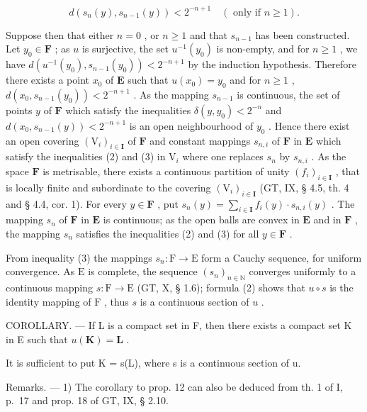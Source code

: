 \[
d \left(s _ {n} (y), s _ {n - 1} (y)\right) <   2 ^ {- n + 1} \quad (\text { only   if } n \geqslant 1).\tag{3}
\]

Suppose then that either \(n = 0\) , or \(n \geqslant 1\) and that \(s_{n-1}\) has been constructed. Let \(y_0 \in \mathbf{F}\) ; as \(u\) is surjective, the set \(u^{-1}(y_0)\) is non-empty, and for \(n \geqslant 1\) , we have \(d(u^{-1}(y_0), s_{n-1}(y_0)) < 2^{-n+1}\) by the induction hypothesis. Therefore there exists a point \(x_0\) of \(\mathbf{E}\) such that \(u(x_0) = y_0\) and for \(n \geqslant 1\) , \(d(x_0, s_{n-1}(y_0)) < 2^{-n+1}\) . As the mapping \(s_{n-1}\) is continuous, the set of points \(y\) of \(\mathbf{F}\) which satisfy the inequalities \(\delta(y, y_0) < 2^{-n}\) and \(d(x_0, s_{n-1}(y)) < 2^{-n+1}\) is an open neighbourhood of \(y_0\) . Hence there exist an open covering \((\mathrm{V}_i)_{i \in \mathbf{I}}\) of \(\mathbf{F}\) and constant mappings \(s_{n,i}\) of \(\mathbf{F}\) in \(\mathbf{E}\) which satisfy the inequalities (2) and (3) in \(\mathrm{V}_i\) where one replaces \(s_n\) by \(s_{n,i}\) . As the space \(\mathbf{F}\) is metrisable, there exists a continuous partition of unity \((f_i)_{i \in \mathbf{I}}\) , that is locally finite and subordinate to the covering \((\mathrm{V}_i)_{i \in \mathbf{I}}\) (GT, IX, § 4.5, th. 4 and § 4.4, cor. 1). For every \(y \in \mathbf{F}\) , put \(s_n(y) = \sum_{i \in \mathbf{I}} f_i(y) \cdot s_{n,i}(y)\) . The mapping \(s_n\) of \(\mathbf{F}\) in \(\mathbf{E}\) is continuous; as the open balls are convex in \(\mathbf{E}\) and in \(\mathbf{F}\) , the mapping \(s_n\) satisfies the inequalities (2) and (3) for all \(y \in \mathbf{F}\) .

From inequality (3) the mappings \(s_n: \mathrm{F} \to \mathrm{E}\) form a Cauchy sequence, for uniform convergence. As \(\mathrm{E}\) is complete, the sequence \((s_n)_{n \in \mathbb{N}}\) converges uniformly to a continuous mapping \(s: \mathrm{F} \to \mathrm{E}\) (GT, X, § 1.6); formula (2) shows that \(u \circ s\) is the identity mapping of \(\mathrm{F}\) , thus \(s\) is a continuous section of \(u\) .

COROLLARY. --- If L is a compact set in F, then there exists a compact set K in E such that \(u(\mathbf{K}) = \mathbf{L}\) .

It is sufficient to put K = s(L), where s is a continuous section of u.

Remarks. --- 1) The corollary to prop. 12 can also be deduced from th. 1 of I, p.~17 and prop. 18 of GT, IX, § 2.10.

